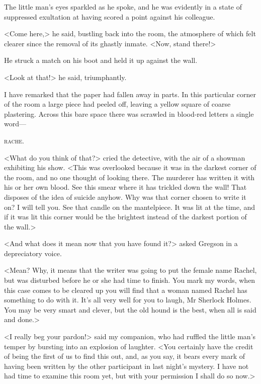 The little man's eyes sparkled as he spoke, and he was evidently in a state of suppressed exultation at having scored a point against his colleague.

<Come here,> he said, bustling back into the room, the atmosphere of which felt clearer since the removal of its ghastly inmate. <Now, stand there!>

He struck a match on his boot and held it up against the wall.

<Look at that!> he said, triumphantly.

I have remarked that the paper had fallen away in parts. In this particular corner of the room a large piece had peeled off, leaving a yellow square of coarse plastering. Across this bare space there was scrawled in blood-red letters a single word—

\centerline{\Large\textsc{rache.}}
\vspace{1em}

<What do you think of that?> cried the detective, with the air of a showman exhibiting his show. <This was overlooked because it was in the darkest corner of the room, and no one thought of looking there. The murderer has written it with his or her own blood. See this smear where it has trickled down the wall! That disposes of the idea of suicide anyhow. Why was that corner chosen to write it on? I will tell you. See that candle on the mantelpiece. It was lit at the time, and if it was lit this corner would be the brightest instead of the darkest portion of the wall.>

<And what does it mean now that you have found it?> asked Gregson in a depreciatory voice.

<Mean? Why, it means that the writer was going to put the female name Rachel, but was disturbed before he or she had time to finish. You mark my words, when this case comes to be cleared up you will find that a woman named Rachel has something to do with it. It's all very well for you to laugh, Mr Sherlock Holmes. You may be very smart and clever, but the old hound is the best, when all is said and done.>

<I really beg your pardon!> said my companion, who had ruffled the little man's temper by bursting into an explosion of laughter. <You certainly have the credit of being the first of us to find this out, and, as you say, it bears every mark of having been written by the other participant in last night's mystery. I have not had time to examine this room yet, but with your permission I shall do so now.>


